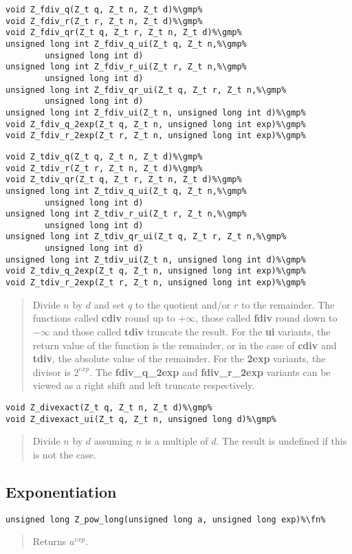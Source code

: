 \documentclass[a4paper,10pt]{article}
\newcommand{\fn}{\hfill[Function]}
\newcommand{\gmp}{\hfill[GMP]}
\begin{document}
\begin{lstlisting}
void Z_fdiv_q(Z_t q, Z_t n, Z_t d)%\gmp%
void Z_fdiv_r(Z_t r, Z_t n, Z_t d)%\gmp%
void Z_fdiv_qr(Z_t q, Z_t r, Z_t n, Z_t d)%\gmp%
unsigned long int Z_fdiv_q_ui(Z_t q, Z_t n,%\gmp% 
        unsigned long int d)
unsigned long int Z_fdiv_r_ui(Z_t r, Z_t n,%\gmp% 
        unsigned long int d)
unsigned long int Z_fdiv_qr_ui(Z_t q, Z_t r, Z_t n,%\gmp%
        unsigned long int d)
unsigned long int Z_fdiv_ui(Z_t n, unsigned long int d)%\gmp%
void Z_fdiv_q_2exp(Z_t q, Z_t n, unsigned long int exp)%\gmp%
void Z_fdiv_r_2exp(Z_t r, Z_t n, unsigned long int exp)%\gmp%
\end{lstlisting}

\begin{lstlisting}
void Z_tdiv_q(Z_t q, Z_t n, Z_t d)%\gmp%
void Z_tdiv_r(Z_t r, Z_t n, Z_t d)%\gmp%
void Z_tdiv_qr(Z_t q, Z_t r, Z_t n, Z_t d)%\gmp%
unsigned long int Z_tdiv_q_ui(Z_t q, Z_t n,%\gmp% 
        unsigned long int d)
unsigned long int Z_tdiv_r_ui(Z_t r, Z_t n,%\gmp% 
        unsigned long int d)
unsigned long int Z_tdiv_qr_ui(Z_t q, Z_t r, Z_t n,%\gmp%
        unsigned long int d)
unsigned long int Z_tdiv_ui(Z_t n, unsigned long int d)%\gmp%
void Z_tdiv_q_2exp(Z_t q, Z_t n, unsigned long int exp)%\gmp%
void Z_tdiv_r_2exp(Z_t r, Z_t n, unsigned long int exp)%\gmp%
\end{lstlisting}
\begin{quote}Divide $n$ by $d$ and set $q$ to the quotient and/or $r$ to the remainder. The functions called \textbf{cdiv} round up to $+\infty$, those called \textbf{fdiv} round down to $-\infty$ and those called $\textbf{tdiv}$ truncate the result. For the \textbf{ui} variants, the return value of the function is the remainder, or in the case of \textbf{cdiv} and \textbf{tdiv}, the absolute value of the remainder. For the \textbf{2exp} variants, the divisor is $2^{exp}$. The \textbf{fdiv\_q\_2exp} and \textbf{fdiv\_r\_2exp} variants can be viewed as a right shift and left truncate respectively.\end{quote}

\begin{lstlisting}
void Z_divexact(Z_t q, Z_t n, Z_t d)%\gmp%
void Z_divexact_ui(Z_t q, Z_t n, unsigned long d)%\gmp%
\end{lstlisting}
\begin{quote}Divide $n$ by $d$ assuming $n$ is a multiple of $d$. The result is undefined if this is not the case.\end{quote}

\subsection{Exponentiation}
\begin{lstlisting}
unsigned long Z_pow_long(unsigned long a, unsigned long exp)%\fn%
\end{lstlisting}
\begin{quote}Returns $a^{exp}$.\end{quote}
\end{document}
